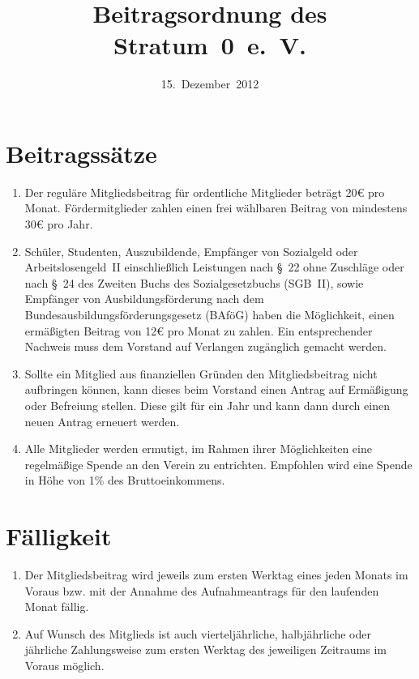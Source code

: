 \documentclass[a4paper,12pt]{scrartcl}
\title{Beitragsordnung des Stratum~0~e.~V.}
\date{15.~Dezember~2012}
\begin{document}
\maketitle

\section{Beitragssätze}
\begin{enumerate}
  \item Der reguläre Mitgliedsbeitrag für ordentliche Mitglieder beträgt 20€
    pro Monat. Fördermitglieder zahlen einen frei wählbaren Beitrag von
    mindestens 30€ pro Jahr.
  \item Schüler, Studenten, Auszubildende, Empfänger von Sozialgeld oder
    Arbeitslosengeld~II
    einschließlich Leistungen nach §~22 ohne Zuschläge oder nach §~24 des
    Zweiten Buchs des Sozialgesetzbuchs (SGB~II), sowie Empfänger von
    Ausbildungsförderung nach dem Bundesausbildungsförderungsgesetz (BAföG)
    haben die Möglichkeit, einen ermäßigten Beitrag von 12€ pro Monat zu
    zahlen. Ein entsprechender Nachweis muss dem Vorstand auf Verlangen
    zugänglich gemacht werden.
  \item Sollte ein Mitglied aus finanziellen Gründen den Mitgliedsbeitrag nicht
    aufbringen können, kann dieses beim Vorstand einen Antrag auf Ermäßigung
    oder Befreiung stellen. Diese gilt für ein Jahr und kann dann durch einen
    neuen Antrag erneuert werden.
  \item Alle Mitglieder werden ermutigt, im Rahmen ihrer Möglichkeiten eine
    regelmäßige Spende an den Verein zu entrichten. Empfohlen wird eine Spende
    in Höhe von 1\% des Bruttoeinkommens.
\end{enumerate}

\section{Fälligkeit}
\begin{enumerate}
  \item Der Mitgliedsbeitrag wird jeweils zum ersten Werktag eines jeden Monats
    im Voraus bzw. mit der Annahme des Aufnahmeantrags für den laufenden Monat
    fällig.
  \item Auf Wunsch des Mitglieds ist auch vierteljährliche, halbjährliche oder
    jährliche Zahlungsweise zum ersten Werktag des jeweiligen Zeitraums im
    Voraus möglich.
\end{enumerate}
\end{document}

